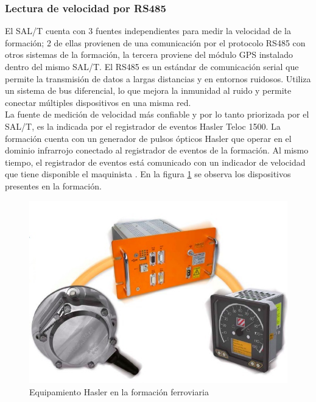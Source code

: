\subsubsection{Lectura de velocidad por RS485}

El SAL/T cuenta con 3 fuentes independientes para medir la velocidad de la formación; 2 de ellas provienen de una comunicación por el protocolo RS485 con otros sistemas de la formación, la tercera proviene del módulo GPS instalado dentro del mismo SAL/T. El RS485 es un estándar de comunicación serial que permite la transmisión de datos a largas distancias y en entornos ruidosos. Utiliza un sistema de bus diferencial, lo que mejora la inmunidad al ruido y permite conectar múltiples dispositivos en una misma red.  \\ 

La fuente de medición de velocidad más confiable y por lo tanto priorizada por el SAL/T, es la indicada por el registrador de eventos Hasler Teloc 1500. La formación cuenta con un generador de pulsos ópticos Hasler que operar en el dominio infrarrojo conectado al registrador de eventos de la formación. Al mismo tiempo, el registrador de eventos está comunicado con un indicador de velocidad que tiene disponible el maquinista \cite{indicador_velocidad}. En la figura \ref{fig:hasler_teloc} se observa los dispositivos presentes en la formación. 

\begin{figure}[H]
    \centering
    \includegraphics[width = 0.7\linewidth]{img/hasler_teloc.jpeg}
    \caption{Equipamiento Hasler en la formación ferroviaria}
    \label{fig:hasler_teloc}
\end{figure}


